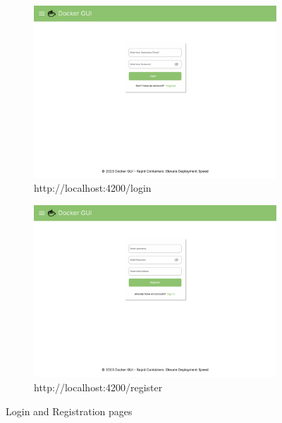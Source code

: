 \documentclass[multi, tikz, a4paper, oneside]{article}
\begin{document}
\begin{figure}[h]
  \centering
  \begin{subfigure}{.5\textwidth}
    \centering
    \includegraphics[width=.95\linewidth]{diagrams/1.login.pdf}
    \caption{http://localhost:4200/login}
    \label{fig:sub1}
  \end{subfigure}%
  \begin{subfigure}{.5\textwidth}
    \centering
    \includegraphics[width=.95\linewidth]{diagrams/1.registration.pdf}
    \caption{http://localhost:4200/register}
    \label{fig:sub2}
  \end{subfigure}
  \caption{Login and Registration pages}
  \label{fig:figma1}
\end{figure}
\end{document}
